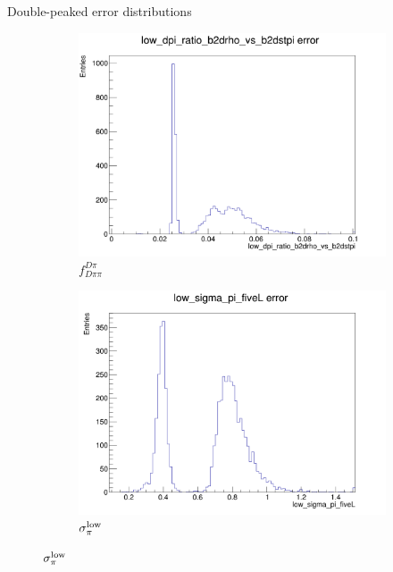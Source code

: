 \documentclass{beamer}
\begin{document}
\begin{frame}{Double-peaked error distributions}
  \begin{figure}
    \centering
    \vspace{-0.2cm}
    \begin{subfigure}{0.5\textwidth}
      \includegraphics[width = 1.0\textwidth]{Plots/low_dpi_ratio_b2drho_vs_b2dstpi_error.png}
      \caption{$f_{D\pi\pi}^{D\pi}$}
    \end{subfigure}%
    \begin{subfigure}{0.5\textwidth}
      \includegraphics[width = 1.0\textwidth]{Plots/low_sigma_pi_fiveL_error.png}
      \caption{$\sigma_\pi^{\rm low}$}
    \end{subfigure}
  \end{figure}
\end{frame}
\end{document}
